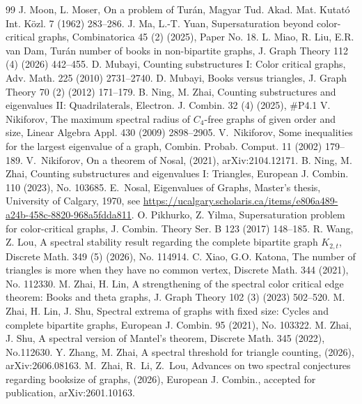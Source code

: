 \documentclass[10pt,a4paper]{amsart}
\begin{document}
\begin{thebibliography}{99}
 J. Moon, L. Moser, On a problem of Tur\'{a}n, Magyar Tud. Akad. Mat. Kutat\'{o} Int. K\"{o}zl. 7 (1962) 283--286.
 J. Ma, L.-T. Yuan, Supersaturation beyond color-critical graphs, Combinatorica 45 (2) (2025), Paper No. 18.
 L. Miao, R. Liu, E.R. van Dam, Turán number of books in non-bipartite graphs, J. Graph Theory 112 (4) (2026) 442--455.
 D. Mubayi, Counting substructures I: Color critical graphs, Adv. Math. 225 (2010) 2731--2740.
 D. Mubayi, Books versus triangles, J. Graph Theory 70 (2) (2012) 171--179.
 B. Ning, M. Zhai, Counting substructures and eigenvalues II: Quadrilaterals, Electron. J. Combin. 32 (4) (2025), \#P4.1
 V. Nikiforov, The maximum spectral radius of $C_4$-free graphs of given order and size, Linear Algebra Appl. 430 (2009) 2898--2905.
 V.~Nikiforov, Some inequalities for the largest eigenvalue of a graph, {Combin. Probab. Comput.} {11} (2002) 179--189.
 V.~Nikiforov, On a theorem of Nosal, (2021), arXiv:2104.12171.
 B. Ning, M. Zhai, Counting substructures and eigenvalues I: Triangles, {European J. Combin.} 110 (2023), No. 103685.
 E.~Nosal, {Eigenvalues of Graphs}, Master's thesis, University of Calgary, 1970, see \url{https://ucalgary.scholaris.ca/items/e806a489-a24b-458c-8820-968a5fdda811}.
 O. Pikhurko, Z. Yilma, Supersaturation problem for color-critical graphs, J. Combin. Theory Ser. B 123 (2017) 148--185.
 R. Wang, Z. Lou, A spectral stability result regarding the complete bipartite graph $K_{2,t}$, Discrete Math. 349 (5) (2026), No. 114914.
 C. Xiao, G.O. Katona, The number of triangles is more when they have no common vertex, Discrete Math. 344 (2021), No. 112330.
 M. Zhai, H. Lin, A strengthening of the spectral color critical edge theorem: Books and theta graphs, J. Graph Theory 102 (3) (2023) 502--520.
 M. Zhai, H. Lin, J. Shu, Spectral extrema of graphs with fixed size: Cycles and complete bipartite graphs, European J. Combin. 95 (2021), No. 103322.
 M. Zhai, J. Shu, A spectral version of Mantel's theorem, Discrete Math. 345 (2022), No.112630.
 Y. Zhang, M. Zhai, A spectral threshold for triangle counting, (2026), arXiv:2606.08163.
 M.~Zhai, R.~Li, Z.~Lou, Advances on two spectral conjectures regarding booksize of graphs, (2026), {European J. Combin.}, accepted for publication, arXiv:2601.10163.
\end{thebibliography}
\end{document}
